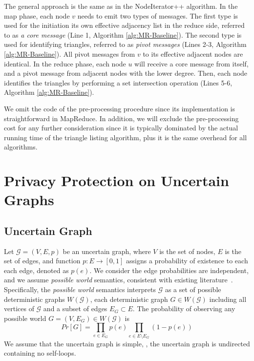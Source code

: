 The general approach is the same as in the NodeIterator++ algorithm. In the map phase, each node $v$ needs to emit two types of messages. The first type is used for the initiation its own effective adjacency list in the reduce side, 
referred to as {\em a core message} (Line 1, Algorithm \ref{alg:MR-Baseline}). 
The second type is used for identifying triangles, referred to as {\em pivot messages} (Lines 2-3, Algorithm \ref{alg:MR-Baseline}). 
All pivot messages from $v$ to its effective adjacent nodes are identical. In the reduce phase, each node $u$ will receive a core message from itself, and a pivot message from adjacent nodes with the lower degree. Then, each node identifies the triangles by performing a set intersection operation (Lines 5-6, Algorithm \ref{alg:MR-Baseline}). 

We omit the code of the pre-processing procedure since its implementation is straightforward in MapReduce. In addition, we will exclude the pre-processing cost for any further consideration since it is typically dominated by the actual running time of the triangle listing algorithm, plus it is the same overhead for all algorithms. 

\section{Privacy Protection on Uncertain Graphs}
\subsection{Uncertain Graph}
Let  $\mathcal{G}=(V,E,\mathit{p})$ be an uncertain graph, where $V$ is the set of nodes, $E$ is the set of edges, and function $\mathit{p}: E \rightarrow [0,1]$ assigns a  probability of existence to each each edge, denoted as $\mathit{p}(e)$. We consider the edge probabilities are independent, and we assume \emph{possible world} semantics, consistent with existing literature~\cite{Potamias_K_2010,Adar_Managing_2007,Kempe_Maximizing_2003}. Specifically, the \emph{possible world} semantics interprets $\mathcal{G}$ as a set of possible deterministic graphs $W(\mathcal{G})$, each deterministic graph $G \in W(\mathcal{G})$ including all vertices of $\mathcal{G}$ and a subset of edges $E_{G} \subset E$.  The probability of observing any possible world $G=(V,E_{G}) \in W(\mathcal{G})$ is 
\begin{equation*}
    Pr[G]=\prod_{e \in E_{G}} {\mathit{p}(e)} \prod_{e \in E     \setminus E_{G}} (1-\mathit{p}(e))
\end{equation*}
We assume that the uncertain graph is simple, {\ie}, the uncertain graph is undirected containing no self-loops.  

